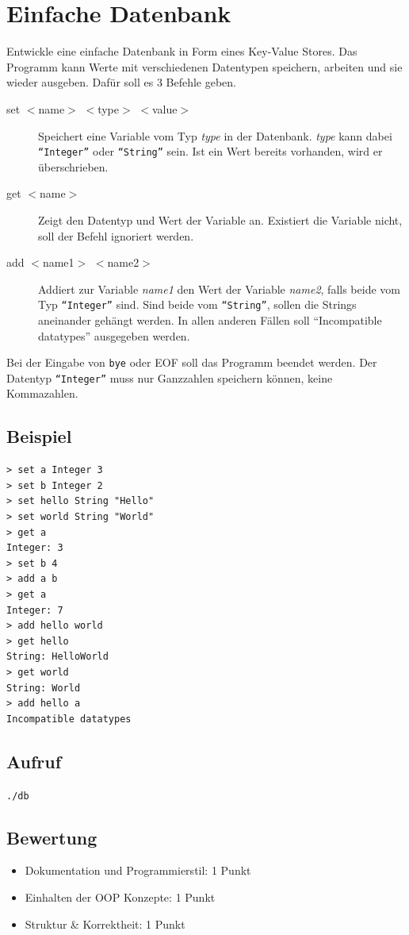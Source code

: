 \documentclass[a4paper,10pt]{article}
\begin{document}
\section*{Einfache Datenbank}

Entwickle eine einfache Datenbank in Form eines Key-Value Stores. Das Programm kann Werte mit verschiedenen Datentypen speichern, arbeiten und sie wieder ausgeben. Dafür soll es 3 Befehle geben.

\begin{description}
 \item[set $<$name$>$ $<$type$>$ $<$value$>$] Speichert eine Variable vom Typ \textit{type} in der Datenbank. \textit{type} kann dabei \texttt{``Integer''} oder \texttt{``String''} sein. Ist ein Wert bereits vorhanden, wird er überschrieben.
 \item[get $<$name$>$] Zeigt den Datentyp und Wert der Variable an. Existiert die Variable nicht, soll der Befehl ignoriert werden.
 \item[add $<$name1$>$ $<$name2$>$] Addiert zur Variable \textit{name1} den Wert der Variable \textit{name2}, falls beide vom Typ \texttt{``Integer''} sind. Sind beide vom \texttt{``String''}, sollen die Strings aneinander gehängt werden. In allen anderen Fällen soll ``Incompatible datatypes'' ausgegeben werden. 
\end{description}

Bei der Eingabe von \texttt{bye} oder EOF soll das Programm beendet werden. Der Datentyp \texttt{``Integer''} muss nur Ganzzahlen speichern können, keine Kommazahlen.

\subsection*{Beispiel}
\begin{verbatim}
> set a Integer 3
> set b Integer 2
> set hello String "Hello"
> set world String "World"
> get a
Integer: 3
> set b 4
> add a b
> get a
Integer: 7
> add hello world
> get hello
String: HelloWorld
> get world
String: World
> add hello a
Incompatible datatypes
\end{verbatim}

\subsection*{Aufruf}
\texttt{./db}

\subsection*{Bewertung}
\begin{itemize}
 \item Dokumentation und Programmierstil: 1 Punkt
 \item Einhalten der OOP Konzepte: 1 Punkt
 \item Struktur \& Korrektheit: 1 Punkt
\end{itemize}

\newpage
\end{document}
